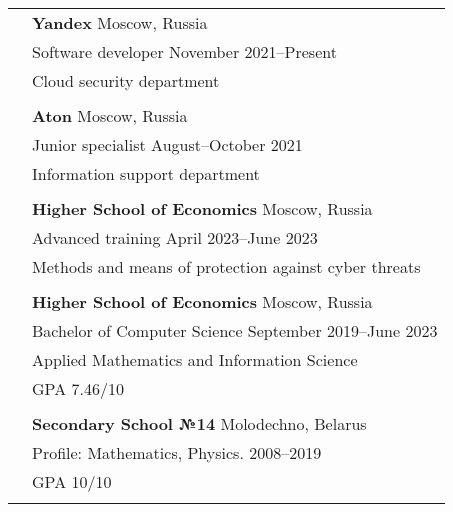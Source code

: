 \documentclass[letterpaper, 11pt]{article}
\begin{document}
\begin{longtable}{p{1.3in}p{4.8in}}






\color{OliveGreen}{Work experience}
& \textbf{Yandex} \hfill Moscow, Russia \\ 
& Software developer \hfill November 2021--Present \\
& Cloud security department \\
& \\


& \textbf{Aton} \hfill Moscow, Russia \\ 
& Junior specialist \hfill August--October 2021 \\
& Information support department \\
& \\





\color{OliveGreen}{Education} 
& \textbf{Higher School of Economics} \hfill Moscow, Russia \\ 
& Advanced training \hfill April 2023--June 2023 \\
& Methods and means of protection against
cyber threats\\
& \\

& \textbf{Higher School of Economics} \hfill Moscow, Russia \\ 
& Bachelor of Computer Science \hfill September 2019--June 2023 \\
& Applied Mathematics and Information Science\\
& GPA 7.46/10 \\
& \\

& \textbf{Secondary School №14} \hfill Molodechno, Belarus \\
& Profile: Mathematics, Physics. \hfill 2008--2019\\
& GPA 10/10 \\
& \\




\end{longtable}
\end{document}
